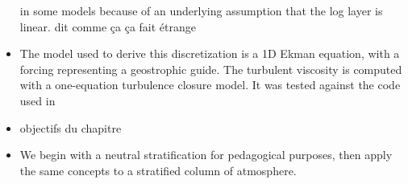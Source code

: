 \begin{itemize}
	in some models
	because of an underlying assumption that the log layer
		is linear. {\color{red} dit comme ça ça fait étrange}
	\item The model used to derive this discretization is a 1D Ekman
	equation, with a forcing representing a geostrophic guide.
		The turbulent viscosity is computed with a
		one-equation turbulence closure model. It was
		tested against the code used in \cite{lemarie_simplified_2021}
\item {\color{red} objectifs du chapitre}
\item We begin with a neutral stratification for pedagogical purposes,
	then apply the same concepts to a stratified column of
		atmosphere.
\end{itemize}
